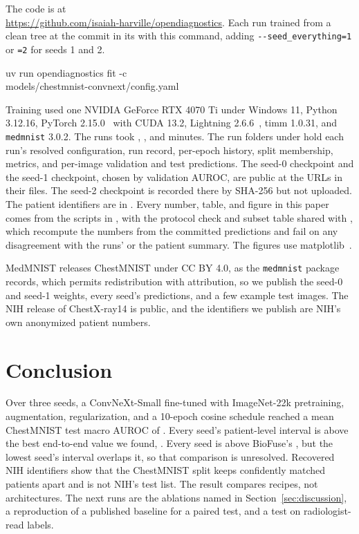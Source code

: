 \documentclass[conference]{IEEEtran}
\newif\ifanycitation
\let\citeAnyKey\cite
\renewcommand{\cite}{\global\anycitationtrue\citeAnyKey}
\begin{document}
The code is at\\
\url{https://github.com/isaiah-harville/opendiagnostics}. Each run trained
from a clean tree at the commit in its  with this command, adding
\texttt{-{}-seed\_everything=1} or \texttt{=2} for seeds 1 and 2.
\begin{flushleft}\footnotesize\ttfamily
uv run opendiagnostics fit -c\\
\quad models/chestmnist-convnext/config.yaml
\end{flushleft} Training used one
NVIDIA GeForce RTX 4070 Ti under Windows 11, Python 3.12.16, PyTorch
2.15.0~\cite{paszke2019pytorch} with CUDA 13.2, Lightning 2.6.6~\cite{falcon2020lightning},
timm 1.0.31, and \texttt{medmnist} 3.0.2. The runs took \runMinutesSeedZero{},
\runMinutesSeedOne{}, and \runMinutesSeedTwo{} minutes. The run folders under
 hold each run's resolved configuration, run
record, per-epoch history, split membership, metrics, and per-image validation and test
predictions. The seed-0 checkpoint and the seed-1 checkpoint, chosen by validation AUROC, are public
at the URLs in their  files. The seed-2 checkpoint is recorded there by
SHA-256 but not uploaded. The
patient identifiers are in . Every
number, table, and figure in this paper comes from the scripts in
, with the protocol check and subset table shared with
, which recompute the numbers from the committed predictions and
fail on any disagreement with the runs'  or the patient summary. The
figures use matplotlib~\cite{hunter2007matplotlib}.

MedMNIST releases ChestMNIST under CC BY 4.0, as the \texttt{medmnist} package records,
which permits redistribution with attribution, so we publish the seed-0 and seed-1 weights, every
seed's predictions, and a few example test images. The NIH release of ChestX-ray14 is
public, and the identifiers we publish are NIH's own anonymized patient numbers.

\section{Conclusion}

Over three seeds, a ConvNeXt-Small fine-tuned with ImageNet-22k pretraining, augmentation,
regularization, and a 10-epoch cosine schedule reached a mean ChestMNIST test macro AUROC of
\testAurocMean{}. Every seed's patient-level interval is above the best end-to-end value we
found, \baseWuAuroc{}. Every seed is above BioFuse's \baseBestAuroc{}, but the lowest
seed's interval overlaps it, so that comparison is unresolved. Recovered NIH identifiers show that
the ChestMNIST split keeps confidently matched patients apart and is not NIH's test list. The result compares
recipes, not architectures. The next runs are the ablations named in
Section~\ref{sec:discussion}, a reproduction of a published baseline for a paired test,
and a test on radiologist-read labels.
\end{document}
